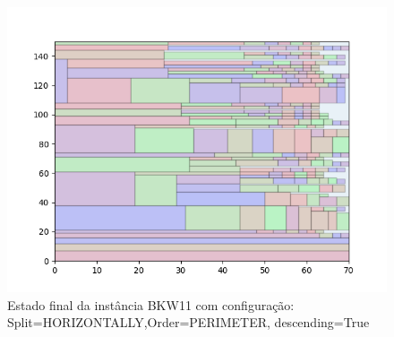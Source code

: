 \begin{figure}[H]
    \centering
    \caption[]{Estado final da instância BKW11 com configuração: Split=HORIZONTALLY,Order=PERIMETER, descending=True}
    \label{fig:bkw11-horizontally-perimeter-true}
    \includegraphics[scale=0.5]{output/figures/bkw/bkw11/horizontally/perimeter/true/000}
\end{figure}